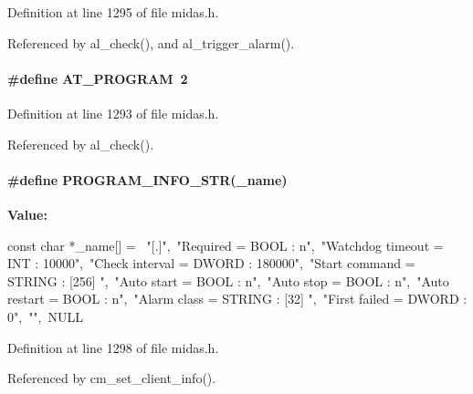 \begin{DoxyItemize}
\item 
\end{DoxyItemize}

Definition at line 1295 of file midas.h.

Referenced by al\_\-check(), and al\_\-trigger\_\-alarm().
\paragraph[{AT\_\-PROGRAM}]{\setlength{\rightskip}{0pt plus 5cm}\#define AT\_\-PROGRAM~2}\hfill\label{group__malarmh_ga258ba8c74f1f017cc80ef51fa82e3e13}

\begin{DoxyItemize}
\item 
\end{DoxyItemize}

Definition at line 1293 of file midas.h.

Referenced by al\_\-check().
\paragraph[{PROGRAM\_\-INFO\_\-STR}]{\setlength{\rightskip}{0pt plus 5cm}\#define PROGRAM\_\-INFO\_\-STR(\_\-name)}\hfill\label{group__malarmh_ga44c5abef81b653fef9341f31af929684}
{\bfseries Value:}
\begin{DoxyCode}
const char *_name[] = {\
"[.]",\
"Required = BOOL : n",\
"Watchdog timeout = INT : 10000",\
"Check interval = DWORD : 180000",\
"Start command = STRING : [256] ",\
"Auto start = BOOL : n",\
"Auto stop = BOOL : n",\
"Auto restart = BOOL : n",\
"Alarm class = STRING : [32] ",\
"First failed = DWORD : 0",\
"",\
NULL }
\end{DoxyCode}


Definition at line 1298 of file midas.h.

Referenced by cm\_\-set\_\-client\_\-info().